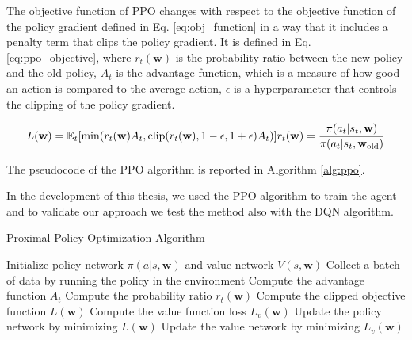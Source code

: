 The objective function of PPO changes with respect to the objective function of the policy gradient defined in Eq. \ref{eq:obj_function} in a way that it includes a penalty term that clips the policy gradient.
It is defined in Eq. \ref{eq:ppo_objective}, where $r_t(\textbf{w})$ is the probability ratio between the new policy and the old policy, $A_t$ is the advantage function, which is a measure of how good an action is compared to the average action, $\epsilon$ is a hyperparameter that controls the clipping of the policy gradient.

\begin{equation} \label{eq:ppo_objective}
    L(\textbf{w}) = \operatorname{\mathbb{E}}_t [\min(r_t(\textbf{w})A_t, \text{clip}(r_t(\textbf{w}), 1-\epsilon, 1+\epsilon)A_t)] \\ \\
    r_t(\textbf{w}) = \frac{\pi(a_t|s_t, \textbf{w})}{\pi(a_t|s_t, \textbf{w}_{\text{old}})}
\end{equation}

The pseudocode of the PPO algorithm is reported in Algorithm \ref{alg:ppo}.



In the development of this thesis, we used the PPO algorithm to train the agent and to validate our approach we test the method also with the DQN algorithm.



\begin{algorithm}
\caption{Proximal Policy Optimization Algorithm}\label{alg:ppo}
\begin{algorithmic}
\State Initialize policy network $\pi(a|s, \textbf{w})$ and value network $V(s, \textbf{w})$
        \State Collect a batch of data by running the policy in the environment
        \State Compute the advantage function $A_t$
        \State Compute the probability ratio $r_t(\textbf{w})$
        \State Compute the clipped objective function $L(\textbf{w})$
        \State Compute the value function loss $L_v(\textbf{w})$
        \State Update the policy network by minimizing $L(\textbf{w})$
        \State Update the value network by minimizing $L_v(\textbf{w})$
    \EndFor
\EndFor
\end{algorithmic}
\end{algorithm}

